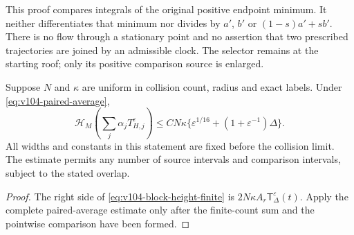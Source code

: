 This proof compares integrals of the original positive endpoint
minimum. It neither differentiates that minimum nor divides by
$a'$, $b'$ or $(1-s)a'+sb'$. There is no flow through a stationary
point and no assertion that two prescribed trajectories are joined
by an admissible clock. The selector remains at the starting roof;
only its positive comparison source is enlarged.

\begin{corollary}
\label{cor:v104-block-height}
Suppose $N$ and $\kappa$ are uniform in collision count, radius and
exact labels. Under \eqref{eq:v104-paired-average},
\begin{equation}\label{eq:v104-block-height}
 \mathcal H_M\!\left(\sum_j\alpha_jT_{H,j}^\varepsilon\right)
 \le C N\kappa\{\varepsilon^{1/16}
                             +(1+\varepsilon^{-1})\Delta\}.
\end{equation}
All widths and constants in this statement are fixed before the
collision limit. The estimate permits any number of source intervals
and comparison intervals, subject to the stated overlap.
\end{corollary}
\begin{proof}
The right side of \eqref{eq:v104-block-height-finite} is
$2N\kappa A_r\mathsf T_\Delta^\varepsilon(t)$. Apply the complete
paired-average estimate only after the finite-count sum and the
pointwise comparison have been formed.
\end{proof}
